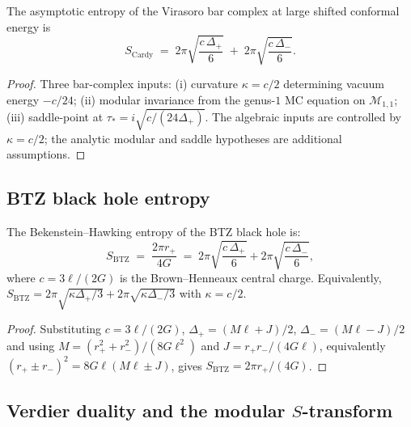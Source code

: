 \documentclass[11pt]{article}
\newcommand{\cM}{\mathcal{M}}
\begin{document}
\begin{proposition}
\label{thm:btz-cardy-wn}
The asymptotic entropy of the Virasoro bar complex at large
shifted conformal energy is
\begin{equation}\label{eq:btz-cardy-wn}
\boxed{
S_{\mathrm{Cardy}}
\;=\;
2\pi\sqrt{\frac{c\,\Delta_+}{6}}
\;+\;
2\pi\sqrt{\frac{c\,\Delta_-}{6}}.
}
\end{equation}
\end{proposition}

\begin{proof}
Three bar-complex inputs: (i) curvature $\kappa = c/2$
determining vacuum energy $-c/24$; (ii) modular invariance
from the genus-$1$ MC equation on $\cM_{1,1}$; (iii)
saddle-point at $\tau_* = i\sqrt{c/(24\Delta_+)}$.  The
algebraic inputs are controlled by $\kappa=c/2$; the analytic
modular and saddle hypotheses are additional assumptions.
\end{proof}

\subsection{BTZ black hole entropy}
\label{subsec:btz-entropy-identification}

\begin{proposition}
\label{thm:btz-entropy-wn}
The Bekenstein--Hawking entropy of the BTZ black hole is:
\begin{equation}\label{eq:btz-entropy-final-wn}
\boxed{
S_{\mathrm{BTZ}}
\;=\;
\frac{2\pi r_+}{4G}
\;=\;
2\pi\sqrt{\frac{c\,\Delta_+}{6}}
+
2\pi\sqrt{\frac{c\,\Delta_-}{6}},
}
\end{equation}
where $c = 3\ell/(2G)$ is the Brown--Henneaux central charge.
Equivalently, $S_{\mathrm{BTZ}} = 2\pi\sqrt{\kappa\Delta_+/3}
+ 2\pi\sqrt{\kappa\Delta_-/3}$ with $\kappa = c/2$.
\end{proposition}

\begin{proof}
Substituting $c = 3\ell/(2G)$,
$\Delta_+ = (M\ell+J)/2$,
$\Delta_- = (M\ell-J)/2$ and using
$M=(r_+^2+r_-^2)/(8G\ell^2)$ and
$J=r_+r_-/(4G\ell)$, equivalently
$(r_+\pm r_-)^2=8G\ell(M\ell\pm J)$, gives
$S_{\mathrm{BTZ}} = 2\pi r_+/(4G)$.
\end{proof}

\subsection{Verdier duality and the modular $S$-transform}
\label{subsec:btz-verdier-modular}
\end{document}
